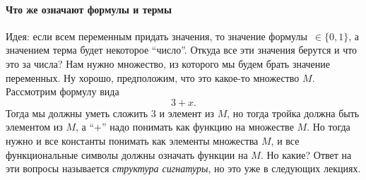 \paragraph{Что же означают формулы и термы}
Идея: если всем переменным придать значения, то значение формулы~$\in \{0, 1\}$, а значением терма будет некоторое \enquote{число}.
Откуда все эти значения берутся и что это за числа?
Нам нужно множество, из которого мы будем брать значение переменных.
Ну хорошо, предположим, что это какое-то множество $M$.
Рассмотрим формулу вида
$$
    3 + x.
$$
Тогда мы должны уметь сложить 3 и элемент из $M$, но тогда тройка должна быть элементом из $M$, а \enquote{$+$} надо понимать как функцию на множестве $M$.
Но тогда нужно и все константы понимать как элементы множества $M$, и все функциональные символы должны означать функции на $M$.
Но какие?
Ответ на эти вопросы называется {\it структура сигнатуры}, но это уже в следующих лекциях.

